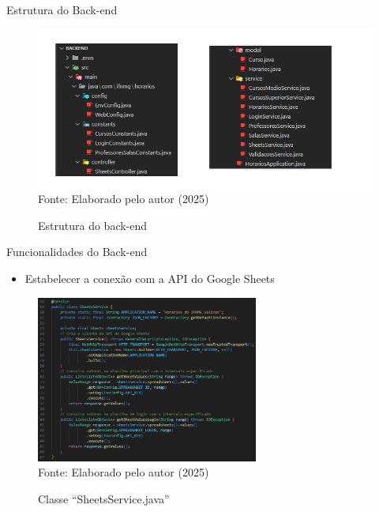 \begin{frame}{Estrutura do Back-end}
    \begin{figure}
        \centering
        \vspace{-0.5cm}
        \caption{Estrutura do back-end}
        \vspace{-0.2cm}
        \includegraphics[width=1\textwidth]{figuras/back-1.png}
        \\ %
        \small Fonte: Elaborado pelo autor (2025)
    \end{figure}
\end{frame}

\begin{frame}{Funcionalidades do Back-end}
    \begin{itemize}
        \item Estabelecer a conexão com a API do Google Sheets
    \end{itemize}
    \begin{figure}
        \centering
        \vspace{-0.5cm}
        \caption{Classe ``SheetsService.java''}
        \vspace{-0.2cm}
        \includegraphics[width=0.65\textwidth]{figuras/back-2.png}
        \\ %
        \small Fonte: Elaborado pelo autor (2025)
    \end{figure}
\end{frame}

